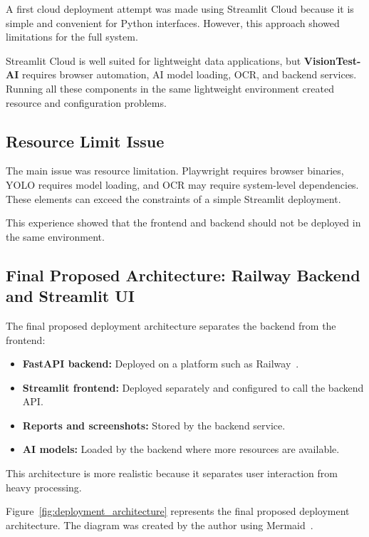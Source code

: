 A first cloud deployment attempt was made using Streamlit Cloud because it is simple and convenient for Python interfaces. However, this approach showed limitations for the full system.

Streamlit Cloud is well suited for lightweight data applications, but \textbf{VisionTest-AI} requires browser automation, AI model loading, OCR, and backend services. Running all these components in the same lightweight environment created resource and configuration problems.

\subsection{Resource Limit Issue}
\label{subsec:resource_limit_issue}

The main issue was resource limitation. Playwright requires browser binaries, YOLO requires model loading, and OCR may require system-level dependencies. These elements can exceed the constraints of a simple Streamlit deployment.

This experience showed that the frontend and backend should not be deployed in the same environment.

\subsection{Final Proposed Architecture: Railway Backend and Streamlit UI}
\label{subsec:final_deployment_architecture}

The final proposed deployment architecture separates the backend from the frontend:

\begin{itemize}
	\item \textbf{FastAPI backend:} Deployed on a platform such as Railway~\cite{railway_docs}.
	\item \textbf{Streamlit frontend:} Deployed separately and configured to call the backend API.
	\item \textbf{Reports and screenshots:} Stored by the backend service.
	\item \textbf{AI models:} Loaded by the backend where more resources are available.
\end{itemize}

This architecture is more realistic because it separates user interaction from heavy processing.

Figure~\ref{fig:deployment_architecture} represents the final proposed deployment architecture. The diagram was created by the author using Mermaid~\cite{mermaid_docs}.

